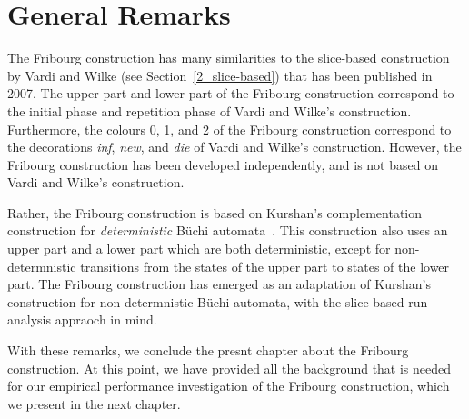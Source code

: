 \section{General Remarks}
\label{3_remarks}
The Fribourg construction has many similarities to the slice-based construction by Vardi and Wilke\cite{vardi2007automata} (see Section~\ref{2_slice-based}) that has been published in 2007. The upper part and lower part of the Fribourg construction correspond to the initial phase and repetition phase of Vardi and Wilke's construction. Furthermore, the colours 0, 1, and 2 of the Fribourg construction correspond to the decorations \textit{inf}, \textit{new}, and \textit{die} of Vardi and Wilke's construction. However, the Fribourg construction has been developed independently, and is not based on Vardi and Wilke's construction.

Rather, the Fribourg construction is based on Kurshan's complementation construction for \textit{deterministic} Büchi automata~\cite{Kurshan198759}. This construction also uses an upper part and a lower part which are both deterministic, except for non-determnistic transitions from the states of the upper part to states of the lower part. The Fribourg construction has emerged as an adaptation of Kurshan's construction for non-determnistic Büchi automata, with the slice-based run analysis appraoch in mind.

With these remarks, we conclude the presnt chapter about the Fribourg construction. At this point, we have provided all the background that is needed for our empirical performance investigation of the Fribourg construction, which we present in the next chapter.




